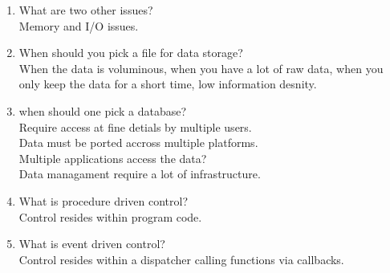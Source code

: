 \documentclass[10pt]{article}
\begin{document}
\begin{enumerate}
      \item What are two other issues?\\
            Memory and I/O issues.

      \item When should you pick a file for data storage?\\
            When the data is voluminous, when you have a lot of raw data, when you only keep the data for a short time, low information desnity.\\

      \item when should one pick a database?\\
            Require access at fine detials by multiple users.\\
            Data must be ported accross multiple platforms.\\
            Multiple applications access the data?\\
            Data managament require a lot of infrastructure.\\

      \item What is procedure driven control?\\
            Control resides within program code.\\
      \item What is event driven control?\\
            Control resides within a dispatcher calling functions via callbacks.\\


\end{enumerate}
\end{document}
